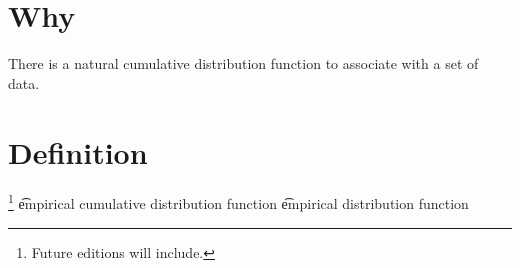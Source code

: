 

\section*{Why}

There is a natural cumulative distribution function to associate with a set of data.

\section*{Definition}
\footnote{Future editions will include.}
\t{empirical cumulative distribution function} \t{empirical distribution function}
\blankpage